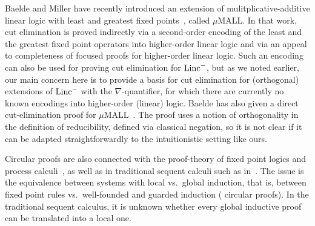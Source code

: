 \documentclass[preprint]{elsarticle}
\newcommand{\Linc}{{\rm Linc}^-}
\begin{document}
Baelde and Miller have recently introduced an extension of mulitplicative-additive
linear logic with least and greatest fixed points~\cite{baelde07lpar}, called $\mu$MALL. 
In that work, cut elimination is proved indirectly via a second-order 
encoding of the least and the greatest fixed point operators 
into higher-order linear logic and via an appeal to completeness of
focused proofs for higher-order linear logic.
Such an encoding can also be used for proving cut elimination
for $\Linc$, but as we noted earlier, our main concern here is
to provide a basis for cut elimination for (orthogonal) extensions
of $\Linc$ with the $\nabla$-quantifier, for which there are
currently no known encodings into higher-order (linear) logic.
Baelde has also given a direct cut-elimination proof for
$\mu$MALL~\cite{Baelde09CoRR}. The proof uses a notion of orthogonality in
the definition of reducibility, defined via classical negation, 
so it is not clear if it can be adapted straightforwardly to 
the intuitionistic setting like ours. 

Circular proofs are also connected with the proof-theory of
{fixed point logics} and {process
  calculi}~\cite{Santocanale02,Sprenger03}, as well as in traditional
sequent calculi such as in~\cite{BrotherstonS07}.  The issue is the
equivalence between systems with local vs.\ global induction, that is,
between fixed point rules vs.\ well-founded and guarded induction (\ie
circular proofs). In the traditional sequent calculus, it is unknown
whether every global inductive proof can be translated into a local
one.
\end{document}

